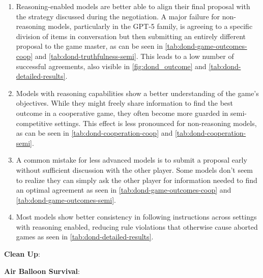 \documentclass[11pt]{article}
\begin{document}


\begin{enumerate}
    \item Reasoning-enabled models are better able to align their final proposal with the strategy discussed during the negotiation. A major failure for non-reasoning models, particularly in the GPT-5 family, is agreeing to a specific division of items in conversation but then submitting an entirely different proposal to the game master, as can be seen in \cref{tab:dond-game-outcomes-coop} and \cref{tab:dond-truthfulness-semi}. This leads to a low number of successful agreements, also visible in \cref{fig:dond_outcome} and \cref{tab:dond-detailed-results}.
    \item Models with reasoning capabilities show a better understanding of the game's objectives. While they might freely share information to find the best outcome in a cooperative game, they often become more guarded in semi-competitive settings. This effect is less pronounced for non-reasoning models, as can be seen in \cref{tab:dond-cooperation-coop} and \cref{tab:dond-cooperation-semi}.
    \item A common mistake for less advanced models is to submit a proposal early without sufficient discussion with the other player. Some models don't seem to realize they can simply ask the other player for information needed to find an optimal agreement as seen in \cref{tab:dond-game-outcomes-coop} and \cref{tab:dond-game-outcomes-semi}.
    \item Most models show better consistency in following instructions across settings with reasoning enabled, reducing rule violations that otherwise cause aborted games as seen in \cref{tab:dond-detailed-results}.
\end{enumerate}

\textbf{Clean Up}:



\textbf{Air Balloon Survival}:
\end{document}
